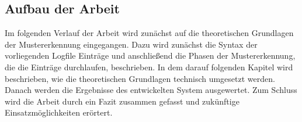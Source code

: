 \subsection{Aufbau der Arbeit}
\label{sub:Aufbau der Arbeit}
Im folgenden Verlauf der Arbeit wird zunächst auf die theoretischen Grundlagen der Mustererkennung eingegangen. Dazu wird zunächst die Syntax der vorliegenden Logfile Einträge und anschließend die Phasen der Mustererkennung, die die Einträge durchlaufen, beschrieben. In dem darauf folgenden Kapitel wird beschrieben, wie die theoretischen Grundlagen technisch umgesetzt werden. Danach werden die Ergebnisse des entwickelten System ausgewertet. Zum Schluss wird die Arbeit durch ein Fazit zusammen gefasst und zukünftige Einsatzmöglichkeiten erörtert.






